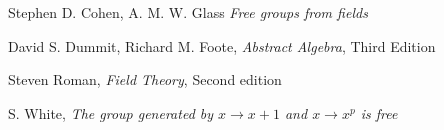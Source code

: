 \begin{thebibliography}{99}

  Stephen D. Cohen, A. M. W. Glass
  \textit{Free groups from fields}

  David S. Dummit,
  Richard M. Foote,
  \textit{Abstract Algebra},
  Third Edition

  Steven Roman,
  \textit{Field Theory},
  Second edition

  S. White,
  \textit{The group generated by $x \rightarrow x + 1$ and $x \rightarrow x^p$
  is free}
\end{thebibliography}
